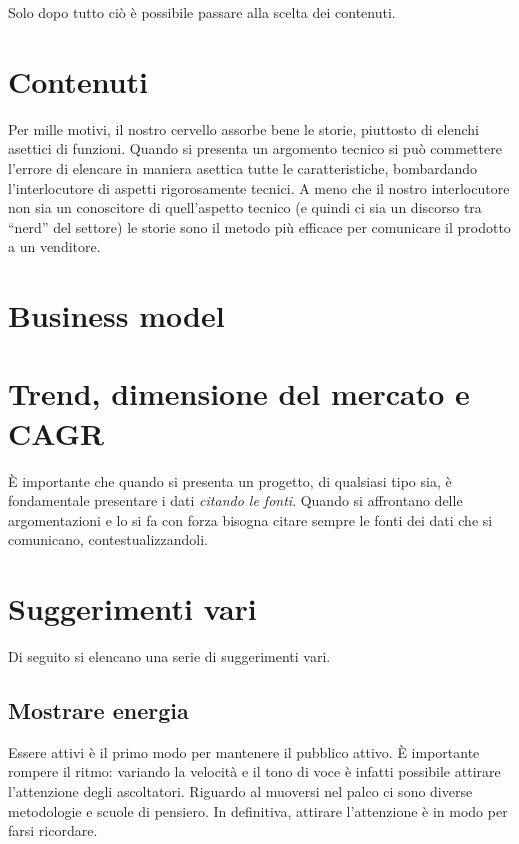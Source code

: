 Solo dopo tutto ciò è possibile passare alla scelta dei contenuti.

\section{Contenuti}


Per mille motivi, il nostro cervello assorbe bene le storie, piuttosto di
elenchi asettici di funzioni. Quando si presenta un argomento tecnico si può
commettere l'errore di elencare in maniera asettica tutte le caratteristiche,
bombardando l'interlocutore di aspetti rigorosamente tecnici. A meno che il
nostro interlocutore non sia un conoscitore di quell'aspetto tecnico (e quindi
ci sia un discorso tra ``nerd'' del settore) le storie sono il metodo più
efficace per comunicare il prodotto a un venditore.

\section{Business model}


\section{Trend, dimensione del mercato e CAGR}

È importante che quando si presenta un progetto, di qualsiasi tipo sia, è
fondamentale presentare i dati \textit{citando le fonti}.
Quando si affrontano delle argomentazioni e lo si fa con forza bisogna citare
sempre le fonti dei dati che si comunicano, contestualizzandoli.

\section{Suggerimenti vari}

Di seguito si elencano una serie di suggerimenti vari.

\subsection{Mostrare energia}

Essere attivi è il primo modo per mantenere il pubblico attivo. È
importante rompere il ritmo: variando la velocità e il tono di voce è
infatti possibile attirare l'attenzione degli ascoltatori. Riguardo al
muoversi nel palco ci sono diverse metodologie e scuole di pensiero. In
definitiva, attirare l'attenzione è in modo per farsi ricordare.

